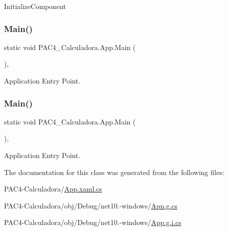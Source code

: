 Initialize\+Component 

\mbox{\label{class_p_a_c4___calculadora_1_1_app_ad8f5859385bff5cdaf83445f71139e07}} 
\subsubsection{\texorpdfstring{Main()}{Main()}\hspace{0.1cm}{\footnotesize\ttfamily [1/2]}}
{\footnotesize\ttfamily static void P\+A\+C4\+\_\+\+Calculadora.\+App.\+Main (\begin{DoxyParamCaption}{ }\end{DoxyParamCaption})\hspace{0.3cm}{\ttfamily [inline]}, {\ttfamily [static]}}



Application Entry Point. 

\mbox{\label{class_p_a_c4___calculadora_1_1_app_ad8f5859385bff5cdaf83445f71139e07}} 
\subsubsection{\texorpdfstring{Main()}{Main()}\hspace{0.1cm}{\footnotesize\ttfamily [2/2]}}
{\footnotesize\ttfamily static void P\+A\+C4\+\_\+\+Calculadora.\+App.\+Main (\begin{DoxyParamCaption}{ }\end{DoxyParamCaption})\hspace{0.3cm}{\ttfamily [inline]}, {\ttfamily [static]}}



Application Entry Point. 



The documentation for this class was generated from the following files\+:\begin{DoxyCompactItemize}
\item 
P\+A\+C4-\/\+Calculadora/\mbox{\hyperlink{_app_8xaml_8cs}{App.\+xaml.\+cs}}\item 
P\+A\+C4-\/\+Calculadora/obj/\+Debug/net10.-\/windows/\mbox{\hyperlink{_app_8g_8cs}{App.\+g.\+cs}}\item 
P\+A\+C4-\/\+Calculadora/obj/\+Debug/net10.-\/windows/\mbox{\hyperlink{_app_8g_8i_8cs}{App.\+g.\+i.\+cs}}\end{DoxyCompactItemize}

